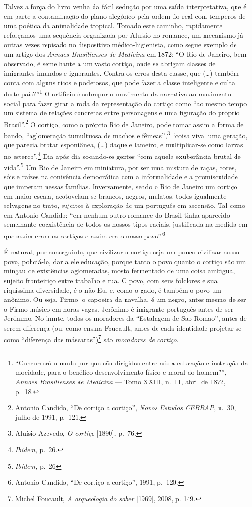 Talvez a força do livro venha da fácil sedução por uma saída
interpretativa, que é em parte a contaminação do plano alegórico pela
ordem do real com temperos de uma poética da animalidade tropical.
Tomado este caminho, rapidamente reforçamos uma sequência organizada por
Aluísio no romance, um mecanismo já outras vezes repisado no dispositivo
médico-higienista, como segue exemplo de um artigo dos \textit{Annaes
Brasilienses de Medicina} em 1872: ``O Rio de Janeiro, bem observado, é
semelhante a um vasto cortiço, onde se abrigam classes de imigrantes
imundos e ignorantes. Contra os erros desta classe, que (\ldots{})
também conta com alguns ricos e poderosos, que pode fazer a classe
inteligente e culta deste país?''\footnote{``Concorrerá o modo por que
  são dirigidas entre nós a educação e instrução da mocidade, para o
  benéfico desenvolvimento físico e moral do homem?'', \textit{Annaes
  Brasilienses de Medicina} --- Tomo XXIII, n.~11, abril de 1872, p.~18.}
O artifício é sobrepor o movimento da narrativa ao movimento social para
fazer girar a roda da representação do cortiço como ``ao mesmo tempo um
sistema de relações concretas entre personagens e uma figuração do
próprio Brasil''.\footnote{Antonio Candido, ``De cortiço a cortiço'',
  \textit{Novos Estudos CEBRAP}, n.~30, julho de 1991, p.~121.} O cortiço,
como o próprio Rio de Janeiro, pode tomar assim a forma de bando,
``aglomeração tumultuosa de machos e fêmeas'',\footnote{Aluísio Azevedo,
  \textit{O cortiço} {[}1890{]}\textit{,} p.~76.} ``coisa viva, uma geração,
que parecia brotar espontânea, (\ldots{}) daquele lameiro, e
multiplicar-se como larvas no esterco''.\footnote{\textit{Ibidem}, p.~26.}
Dia após dia socando-se gentes ``com aquela exuberância brutal de
vida''.\footnote{\textit{Ibidem,} p.~26} Um Rio de Janeiro em miniatura,
por ser uma mistura de raças, cores, sóis e raízes na conivência
democrática com a informalidade e a promiscuidade que imperam nessas
famílias. Inversamente, sendo o Rio de Janeiro um cortiço em maior
escala, acotovelam-se brancos, negros, mulatos, todos igualmente
selvagens no trato, sujeitos à exploração de um português em ascensão.
Tal como em Antonio Candido: ``em nenhum outro romance do Brasil tinha
aparecido semelhante coexistência de todos os nossos tipos raciais,
justificada na medida em que assim eram os cortiços e assim era o nosso
povo''.\footnote{Antonio Candido, ``De cortiço a cortiço'', 1991,
  p.~120.}

É natural, por conseguinte, que civilizar o cortiço seja um pouco
civilizar nosso povo, policiá-lo, dar a ele educação, porque tanto o
povo quanto o cortiço são um mingau de existências aglomeradas, mosto
fermentado de uma coisa ambígua, sujeito fronteiriço entre trabalho e
rua. O povo, com seus folclores e sua riquíssima diversidade, é o não
Eu, e, como o gado, é também o povo um anônimo. Ou seja, Firmo, o
capoeira da navalha, é um negro, antes mesmo de ser o Firmo músico em
horas vagas. Jerônimo é imigrante português antes de ser Jerônimo. No
limite, todos os moradores da ``Estalagem de São Romão'', antes de serem
diferença (ou, como ensina Foucault, antes de cada identidade
projetar-se como ``diferença das máscaras'')\footnote{Michel Foucault,
  \textit{A arqueologia do saber} {[}1969{]}, 2008, p. 149.} são
\textit{moradores de cortiço}.

